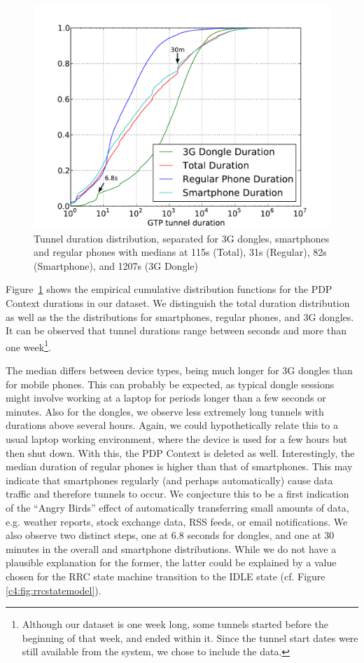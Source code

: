 \begin{figure}[htbp]
	\centering
	\includegraphics[width=\textwidth]{images/tunnel-dur-class-cdf-mod.pdf}
	\caption{Tunnel duration distribution, separated for 3G dongles, smartphones and regular phones with medians at 115s (Total), 31s (Regular), 82s (Smartphone), and 1207s (3G Dongle)}
	\label{c4:fig:cdf-duration-device-class-CONEXT}
\end{figure}

Figure~\ref{c4:fig:cdf-duration-device-class-CONEXT} shows the empirical cumulative distribution functions for the PDP Context durations in our dataset. We distinguish the total duration distribution as well as the the distributions for smartphones, regular phones, and 3G dongles. It can be observed that tunnel durations range between  seconds and more than one week\footnote{Although our dataset is one week long, some tunnels started before the beginning of that week, and ended within it. Since the tunnel start dates were still available from the system, we chose to include the data.}.

The median differs between device types, being much longer for 3G dongles than for mobile phones. This can probably be expected, as typical dongle sessions might involve working at a laptop for periods longer than a few seconds or minutes. Also for the dongles, we observe less extremely long tunnels with durations above several hours. Again, we could hypothetically relate this to a usual laptop working environment, where the device is used for a few hours but then shut down. With this, the PDP Context is deleted as well. Interestingly, the median duration of regular phones is higher than that of smartphones. This may indicate that  smartphones regularly (and perhaps automatically) cause data traffic and therefore tunnels to occur. We conjecture this to be a first indication of the ``Angry Birds'' effect of automatically transferring small amounts of data, e.g. weather reports, stock exchange data, RSS feeds, or email notifications. We also observe two distinct steps, one at 6.8 seconds for dongles, and one at 30 minutes in the overall and smartphone distributions. While we do not have a plausible explanation for the former, the latter could be explained by a value chosen for the RRC state machine transition to the IDLE state (cf. Figure \ref{c4:fig:rrcstatemodel}).


